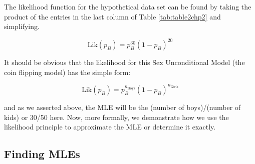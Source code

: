 \documentclass[
]{krantz}
\newcommand{\lik}{\mathrm{Lik}}
\begin{document}
\begin{table}[t]

\caption{\label{tab:table2chp2}The likelihood factors for the hypothetical data set of n=50 children.}
\centering
{}
\end{table}

The likelihood function for the hypothetical data set can be found by taking the product of the entries in the last column of Table \ref{tab:table2chp2} and simplifying.

\begin{equation}
 \lik(p_B) = p_B^{30}(1-p_B)^{20}
 \label{eq:lik30}
\end{equation}

It should be obvious that the likelihood for this Sex Unconditional Model (the coin flipping model) has the simple form:

\begin{equation}
\lik(p_B) = p_B^{n_\textrm{Boys}}(1-p_B)^{n_\textrm{Girls}}
 \label{eq:lik30v2}
\end{equation}

and as we asserted above, the MLE will be the (number of boys)/(number of kids) or 30/50 here. Now, more formally, we demonstrate how we use the likelihood principle to approximate the MLE or determine it exactly.

\hypertarget{findMLE.sec}{%
\subsection{Finding MLEs}\label{findMLE.sec}}
\end{document}
